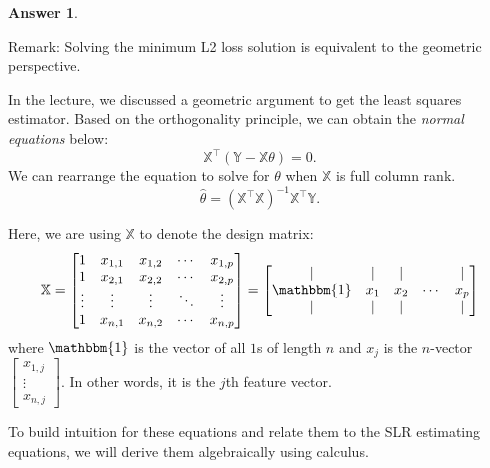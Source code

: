 \documentclass[addpoints, 12pt]{exam}
\theoremstyle{definition}
\newtheorem*{answer}{Answer}
\begin{document}
\begin{questions}
\begin{parts}
\begin{shaded}
\begin{answer}
    \end{answer}
    \end{shaded}

\end{parts}

Remark: Solving the minimum L2 loss solution is equivalent to the geometric perspective. 


\newpage
{}

\vspace{-1em}

\question[7] 
In the lecture, we discussed a geometric argument to get the least squares estimator. Based on the orthogonality principle, we can obtain the {\em normal equations} below: 
\[
\mathbb{X}^{\top}(\mathbb{Y} - \mathbb{X}\theta) = 0.
\]
We can rearrange the equation to solve for $\theta$ when $\mathbb{X}$ is full column rank.
\[
\hat{\theta} = (\mathbb{X}^{\top}\mathbb{X})^{-1}\mathbb{X}^{\top}\mathbb{Y}.
\]

Here, we are using $\mathbb{X}$ to denote the design matrix:
\[
\mathbb{X} = \begin{bmatrix} 
    1  & x_{1,1}  & x_{1,2}  & \cdots & x_{1,p}\\
    1  & x_{2,1}  & x_{2,2}    & \cdots & x_{2,p}\\
    \vdots & \vdots & \vdots & \ddots & \vdots\\
    1  & x_{n,1}  & x_{n,2}    & \cdots & x_{n,p}
\end{bmatrix}  = 
\begin{bmatrix}
| & | & | &  & |\\
\mathbbm{1} & x_1 & x_2 & \cdots & x_p\\
| & | & | &  & |\\
\end{bmatrix}
\]
where $\mathbbm{1}$ is the vector of all $1$s of length $n$ and $x_j$ is the $n$-vector $\begin{bmatrix} 
 x_{1,j} \\ \vdots \\ x_{n,j} \end{bmatrix} $. In other words, it is the $j$th feature vector.

To build intuition for these equations and relate them to the SLR estimating equations, we will derive them algebraically using calculus.




\end{questions}
\end{document}
